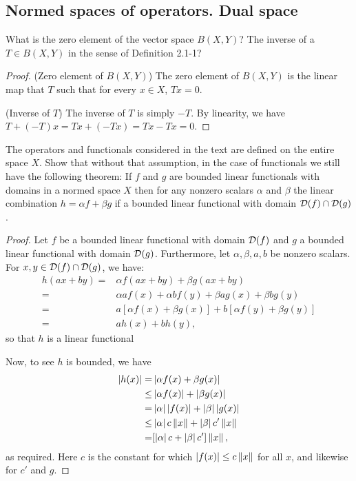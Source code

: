 \subsection{Normed spaces of operators. Dual space}


\begin{exercise}{1}
What is the zero element of the vector space $B(X,Y)$?
The inverse of a $T\in B(X,Y)$ in the sense of Definition 2.1-1?
\end{exercise}
\begin{proof}
(Zero element of $B(X,Y)$) 
The zero element of $B(X,Y)$ is the linear map that $T$ such that for every $x\in X$, $Tx=0$.

(Inverse of $T$)
The inverse of $T$ is simply $-T$.
By linearity, we have $T + (-T)x= Tx + (-Tx) = Tx - Tx = 0$.
\end{proof}

\begin{exercise}{2}
The operators and functionals considered in the text are defined on the entire space $X$.
Show that without that assumption, in the case of functionals we still have the following theorem:
If $f$ and $g$ are bounded linear functionals with domains in a normed space $X$ then for any nonzero scalars $\alpha$ and $\beta$ the linear combination $h=\alpha f+\beta g$ if a bounded linear functional with domain $\mathcal{D}(f)\cap\mathcal{D}(g)$.
\end{exercise}
\begin{proof}
Let $f$ be a bounded linear functional with domain $\mathcal{D}(f)$ and $g$ a bounded linear functional with domain $\mathcal{D}(g)$.
Furthermore, let $\alpha, \beta, a, b$ be nonzero scalars.
For $x,y \in\mathcal{D}(f)\cap\mathcal{D}(g)$, we have:
\begin{align*}
    h(ax+by) 
    =& \alpha f(ax+by) + \beta g(ax+by)\\
    =& \alpha af(x)+ \alpha bf(y) + \beta ag(x) + \beta bg(y)\\
    =& a[\alpha f(x) + \beta g(x)] + b[\alpha f(y) + \beta g(y)]\\
    =& ah(x) + bh(y),
\end{align*}
so that $h$ is a linear functional

Now, to see $h$ is bounded, we have 
\begin{align*}
    \left\lvert h(x)\right\rvert 
    =& \left\lvert \alpha f(x) + \beta g(x)\right\rvert\\
    \leq& \left\lvert \alpha f(x)\right\rvert + \left\lvert \beta g(x)\right\rvert\\
    =& \left\lvert \alpha\right\rvert\left\lvert f(x)\right\rvert + \left\lvert \beta\right\rvert\left\lvert g(x)\right\rvert\\
    \leq& \left\lvert \alpha\right\rvert c\left\lVert x\right\rVert + \left\lvert \beta\right\rvert c'\left\lVert x\right\rVert\\
    =& [\left\lvert \alpha\right\rvert c + \left\lvert \beta\right\rvert c']\left\lVert x\right\rVert,
\end{align*}
as required.
Here $c$ is the constant for which $\left\lvert f(x)\right\rvert \leq c\left\lVert x\right\rVert$ for all $x$, and likewise for $c'$ and $g$.
\end{proof}

